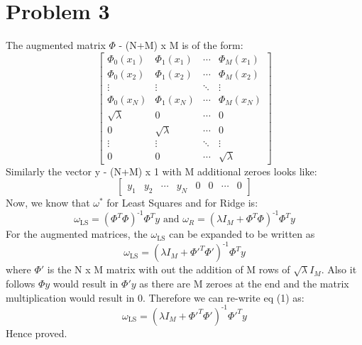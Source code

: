\documentclass[11pt, a4paper, fleqn]{article}
\begin{document}
\section{Problem 3}
The augmented matrix $\Phi$ - (N+M) x M is of the form:
\[\begin{bmatrix}
\Phi_0(x_1)&\Phi_1(x_1)&\cdots &\Phi_M(x_1) \\
\Phi_0(x_2)&\Phi_1(x_2)&\cdots &\Phi_M(x_2) \\
\vdots & \vdots & \ddots & \vdots\\
\Phi_0(x_N)&\Phi_1(x_N)&\cdots &\Phi_M(x_N)\\
\sqrt{\lambda}&0&\cdots & 0\\
0&\sqrt{\lambda}&\cdots & 0\\
\vdots & \vdots & \ddots & \vdots\\
0&0&\cdots &\sqrt{\lambda}
\end{bmatrix}\]
Similarly the vector y - (N+M) x 1 with M additional zeroes looks like:
\[\begin{bmatrix}
y_1&y_2&\cdots &y_N& 0&0&\cdots&0
\end{bmatrix}\]
\newpage
Now, we know that $\omega^*$ for Least Squares and for Ridge is:
\begin{equation*}
\omega_\text{LS} = (\Phi^T \Phi)^\text{-1} \Phi^T y \text{  and } 
\omega_R = (\lambda I_M + \Phi^T \Phi)^\text{-1} \Phi^T y 
\end{equation*}
For the augmented matrices, the $\omega_\text{LS}$ can be expanded to be written as 
\begin{equation}
\omega_\text{LS} =  (\lambda I_M + \Phi'^T \Phi')^\text{-1} \Phi^T y 
\end{equation}
where $\Phi'$ is the N x M matrix with out the addition of M rows of $\sqrt{\lambda} I_M$. Also it follows $\Phi y$ would result in $\Phi' y$ as there are M zeroes at the end and the matrix multiplication would result in 0. Therefore we can re-write eq (1) as:
\begin{equation*}
\omega_\text{LS} =  (\lambda I_M + \Phi'^T \Phi')^\text{-1} \Phi'^T y 
\end{equation*}
Hence proved.
\end{document}
